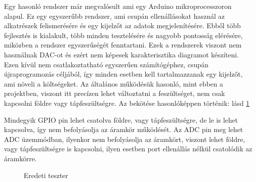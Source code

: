 Egy hasonló rendszer már megvalósult \cite{similarSystem} ami egy Arduino\cite{ArduinoAtmega} 
mikroprocesszoron alapul. Ez egy egyszerűbb rendszer, ami csupán ellenállásokat használ az 
alkatrészek felismerésére és egy kijelzőt az adatok megjelenítésére. Ebből több fejlesztés is 
kialakult, több minden tesztelésére és nagyobb pontosság elérésére, miközben a rendszer 
egyszerűségét fenntartani. Ezek a rendszerek viszont nem használnak DAC-ot és ezért nem képesek 
karakterisztika diagramot készíteni. Ezen kívül nem csatlakoztatható egyszerűen számítógéphez, 
csupán újraprogramozás céljából, így minden esetben kell tartalmazzanak egy kijelzőt, ami 
növeli a költségeket. Az általános működésük hasonló, mint ebben a projektben, viszont itt 
precízen lehet változtatni a feszültséget, nem csak kapcsolni földre vagy tápfeszültségre.
Az bekötése hasonlóképpen történik: lásd \ref{fig:basicTesterConnection}

Mindegyik GPIO pin lehet csatolva földre, vagy tápfeszültségre, de le is lehet kapcsolva, így 
nem befolyásolja az áramkör működését. Az ADC pin meg lehet ADC üzemmódban, ilyenkor nem befolyásolja
az áramkört, viszont lehet földre, vagy tápfeszültségre is kapcsolni, ilyen esetben port ellenállás
nélkül csatolódik az áramkörre.

\begin{figure}[H]
    \centering
    \caption{Eredeti teszter}
    \label{fig:basicTesterConnection}
\end{figure}